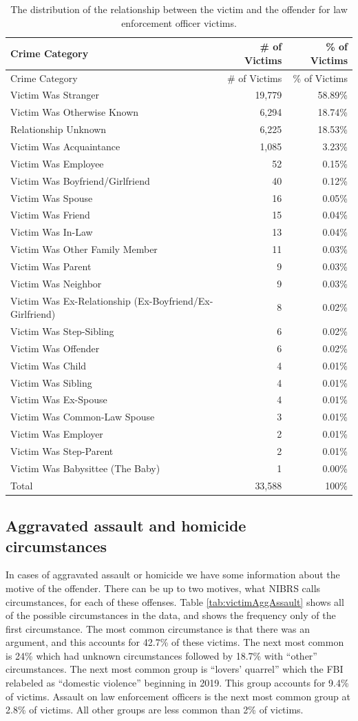 \documentclass[
  12pt,
  openany]{book}
\begin{document}
\begin{longtable}[]{@{}lrr@{}}
\caption{\label{tab:victimRelationshipPolice}The distribution of the relationship between the victim and the offender for law enforcement officer victims.}\tabularnewline
\toprule
Crime Category & \# of Victims & \% of Victims\tabularnewline
\midrule
\endfirsthead
\toprule
Crime Category & \# of Victims & \% of Victims\tabularnewline
\midrule
\endhead
Victim Was Stranger & 19,779 & 58.89\%\tabularnewline
Victim Was Otherwise Known & 6,294 & 18.74\%\tabularnewline
Relationship Unknown & 6,225 & 18.53\%\tabularnewline
Victim Was Acquaintance & 1,085 & 3.23\%\tabularnewline
Victim Was Employee & 52 & 0.15\%\tabularnewline
Victim Was Boyfriend/Girlfriend & 40 & 0.12\%\tabularnewline
Victim Was Spouse & 16 & 0.05\%\tabularnewline
Victim Was Friend & 15 & 0.04\%\tabularnewline
Victim Was In-Law & 13 & 0.04\%\tabularnewline
Victim Was Other Family Member & 11 & 0.03\%\tabularnewline
Victim Was Parent & 9 & 0.03\%\tabularnewline
Victim Was Neighbor & 9 & 0.03\%\tabularnewline
Victim Was Ex-Relationship (Ex-Boyfriend/Ex-Girlfriend) & 8 & 0.02\%\tabularnewline
Victim Was Step-Sibling & 6 & 0.02\%\tabularnewline
Victim Was Offender & 6 & 0.02\%\tabularnewline
Victim Was Child & 4 & 0.01\%\tabularnewline
Victim Was Sibling & 4 & 0.01\%\tabularnewline
Victim Was Ex-Spouse & 4 & 0.01\%\tabularnewline
Victim Was Common-Law Spouse & 3 & 0.01\%\tabularnewline
Victim Was Employer & 2 & 0.01\%\tabularnewline
Victim Was Step-Parent & 2 & 0.01\%\tabularnewline
Victim Was Babysittee (The Baby) & 1 & 0.00\%\tabularnewline
Total & 33,588 & 100\%\tabularnewline
\bottomrule
\end{longtable}

\hypertarget{aggravated-assault-and-homicide-circumstances}{%
\subsection{Aggravated assault and homicide circumstances}\label{aggravated-assault-and-homicide-circumstances}}

In cases of aggravated assault or homicide we have some information about the motive of the offender. There can be up to two motives, what NIBRS calls circumstances, for each of these offenses. Table \ref{tab:victimAggAssault} shows all of the possible circumstances in the data, and shows the frequency only of the first circumstance. The most common circumstance is that there was an argument, and this accounts for 42.7\% of these victims. The next most common is 24\% which had unknown circumstances followed by 18.7\% with ``other'' circumstances. The next most common group is ``lovers' quarrel'' which the FBI relabeled as ``domestic violence'' beginning in 2019. This group accounts for 9.4\% of victims. Assault on law enforcement officers is the next most common group at 2.8\% of victims. All other groups are less common than 2\% of victims.
\end{document}
